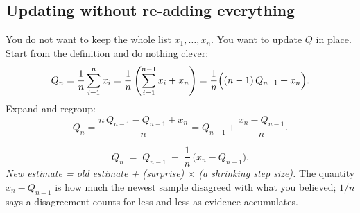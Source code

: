 \subsection{Updating without re-adding everything}

You do not want to keep the whole list $x_1,\dots,x_n$. You want to update $Q$ in place.
Start from the definition and do nothing clever:
\[
Q_{n} = \frac{1}{n}\sum_{i=1}^{n} x_i
      = \frac{1}{n}\left(\sum_{i=1}^{n-1} x_i + x_n\right)
      = \frac{1}{n}\Bigl((n-1)\,Q_{n-1} + x_n\Bigr).
\]
Expand and regroup:
\[
Q_n = \frac{n\,Q_{n-1} - Q_{n-1} + x_n}{n} = Q_{n-1} + \frac{x_n - Q_{n-1}}{n}.
\]

\begin{finalform}
\begin{equation}
  \label{eq:incmean}
  Q_n \;=\; Q_{n-1} \;+\; \frac{1}{n}\,\bigl(x_n - Q_{n-1}\bigr).
\end{equation}
\emph{New estimate = old estimate + (surprise) $\times$ (a shrinking step size).} The
quantity $x_n - Q_{n-1}$ is how much the newest sample disagreed with what you believed;
$1/n$ says a disagreement counts for less and less as evidence accumulates.
\end{finalform}

